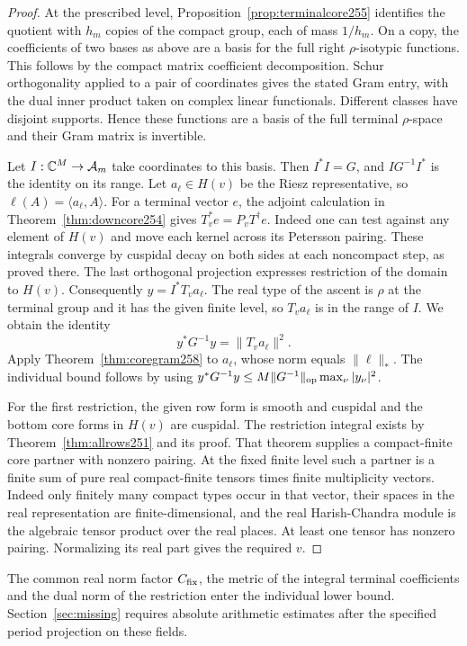 \documentclass[a4paper,11pt]{article}
\theoremstyle{definition}
\theoremstyle{remark}
\numberwithin{equation}{section}
\begin{document}
\begin{proof}
At the prescribed level, Proposition~\ref{prop:terminalcore255}
identifies the quotient with \(h_m\) copies of the compact
group, each of mass \(1/h_m\). On a copy, the coefficients of
two bases as above are a basis for the full right
\(\rho\)-isotypic functions. This follows by the compact
matrix coefficient decomposition. Schur orthogonality applied
to a pair of coordinates gives the stated Gram entry, with
the dual inner product taken on complex linear functionals.
Different classes have disjoint supports. Hence these functions
are a basis of the full terminal \(\rho\)-space and their
Gram matrix is invertible.

Let \(I:\mathbb C^M\to\mathcal A_m\) take coordinates to this basis.
Then \(I^*I=G\), and \(IG^{-1}I^*\) is the identity on its
range. Let \(a_\ell\in H(v)\) be the Riesz representative,
so \(\ell(A)=\langle a_\ell,A\rangle\).
For a terminal vector \(e\), the adjoint calculation in
Theorem~\ref{thm:downcore254} gives
\(T_v^*e=P_vT^\dagger e\). Indeed one can test against any
element of \(H(v)\) and move each kernel across its Petersson
pairing. These integrals converge by cuspidal decay on both
sides at each noncompact step, as proved there. The last
orthogonal projection expresses restriction of the domain
to \(H(v)\). Consequently \(y=I^*T_v a_\ell\). The real type
of the ascent is \(\rho\) at the terminal group and it has
the given finite level, so \(T_v a_\ell\) is in the range
of \(I\). We obtain the identity
\[
                  y^*G^{-1}y=\|T_v a_\ell\|^2.
\]
Apply Theorem~\ref{thm:coregram258} to \(a_\ell\), whose norm
equals \(\|\ell\|_*\). The individual bound follows by using
\(y^*G^{-1}y\le M\|G^{-1}\|_{\rm op}\max_\nu|y_\nu|^2\).

For the first restriction, the given row form is smooth and
cuspidal and the bottom core forms in \(H(v)\) are cuspidal.
The restriction integral exists by Theorem~\ref{thm:allrows251}
and its proof. That theorem supplies a compact-finite core
partner with nonzero pairing. At the fixed finite level such
a partner is a finite sum of pure real compact-finite tensors
times finite multiplicity vectors. Indeed only finitely many
compact types occur in that vector, their spaces in the real
representation are finite-dimensional, and the real
Harish-Chandra module is the algebraic tensor product over
the real places. At least one tensor has nonzero pairing.
Normalizing its real part gives the required \(v\).
\end{proof}
The common real norm factor \(C_{\rm fix}\), the metric of the
integral terminal coefficients and the dual norm of the
restriction enter the individual lower bound. Section~\ref{sec:missing}
requires absolute arithmetic estimates after the specified
period projection on these fields.
\end{document}
